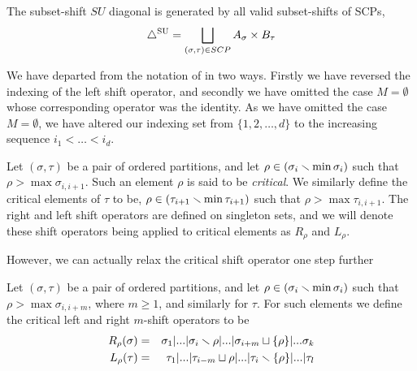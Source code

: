 \begin{proposition}
The subset-shift $SU$ diagonal is generated by all valid subset-shifts of SCPs,
\begin{align*}
    \triangle^{\mathrm{SU}} = \bigsqcup_{(\sigma,\tau) \in SCP} A_\sigma \times B_\tau
\end{align*}

\end{proposition}

We have departed from the notation of \cite{saneblidzeComparingDiagonalsAssociahedra2022} in two ways.
Firstly we have reversed the indexing of the left shift operator, and secondly we have omitted the case $M=\emptyset$ whose corresponding operator was the identity. 
As we have omitted the case $M=\emptyset$, we have altered our indexing set from $\{1,2,\dots,d\}$ to the increasing sequence $i_1<\dots<i_d$.

\begin{definition} \label{def:critical SU shift}
    Let $(\sigma,\tau)$ be a pair of ordered partitions, and let $\rho \in (\sigma_i \smallsetminus \min \sigma_i)$ such that $\rho>\max \sigma_{i,i+1}$.
    Such an element $\rho$ is said to be \emph{critical}. 
    We similarly define the critical elements of $\tau$ to be, $\rho \in (\tau_{i+1} \smallsetminus \min\tau_{i+1})$ such that $\rho > \max \tau_{i,i+1}$. 
    The right and left shift operators are defined on singleton sets, and we will denote these shift operators being applied to critical elements as $R_{\rho}$ and $L_{\rho}$.
\end{definition}


However, we can actually relax the critical shift operator one step further 
\begin{definition} \label{def:critical SU m shift}
Let $(\sigma,\tau)$ be a pair of ordered partitions, and let $\rho \in (\sigma_i \smallsetminus \min \sigma_i)$ such that $\rho>\max \sigma_{i,i+m}$, where $m\geq 1$, and similarly for $\tau$.
For such elements we define the critical left and right $m$-shift operators to be
\begin{eqnarray*}
  R_\rho(\sigma) & = & \sigma_1|...|\sigma_i \smallsetminus \rho|...|\sigma_{i+m} \sqcup \{\rho\}|...\sigma_k \\
  L_\rho(\tau) & = & \tau_1|...|\tau_{i-m}\sqcup \rho|...|\tau_i \smallsetminus \{\rho\}|...|\tau_l
\end{eqnarray*}
\end{definition}

